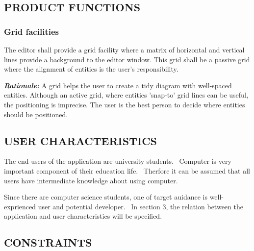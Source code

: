 \documentclass[twoside,letterpaper]{article}
\begin{document}
\subsection[PRODUCT
FUNCTIONS]{\rmfamily\bfseries\color{black}
PRODUCT FUNCTIONS}

\subsubsection[Grid facilities
]{\rmfamily\bfseries\color{black}
Grid facilities}

{\color{black}
The editor shall provide a grid facility where a matrix of horizontal and vertical lines provide a background to the editor window. This grid shall be a passive grid where the alignment of entities is the user's responsibility.}

\smallskip

{\noindent{}\color{black}
\textbf{\emph{Rationale:}} A grid helps the user to create a tidy diagram with well-spaced entities. Although an active grid, where entities 'snap-to' grid lines can be useful, the positioning is imprecise. The user is the best person to decide where entities should be positioned.}

\subsection[USER
CHARACTERISTICS]{\rmfamily\bfseries\color{black}
USER CHARACTERISTICS}

{\color{black}
The end-users of the application are university students. \ Computer is very important component of their education life. \ Therfore it can be assumed that all users have intermediate knowledge about using computer.}

\smallskip

{ \noindent {}\color{black}
Since there are computer science students, one of target auidance is well-exprienced user and potential developer. \ In section 3, the relation between the application and user characteristics will be specified.}

\subsection[CONSTRAINTS]{\rmfamily\bfseries\color{black}
CONSTRAINTS}
\end{document}
